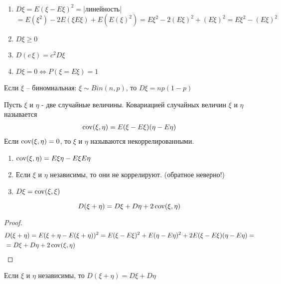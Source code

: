 \begin{lemma}~
	\begin{enumerate}
		\item $D\xi = E(\xi - E\xi)^2 = $|линейность|$ = E(\xi^2) - 2E(\xi E\xi) + E(E(\xi)^2) = E\xi^2 - 2(E\xi)^2 + (E\xi)^2  =E\xi^2 - (E\xi)^2$
		\item $D\xi \geq 0$
		\item $D(c\, \xi) = c^2 D\xi$
		\item $D\xi = 0 \Leftrightarrow P(\xi = E\xi) = 1$
	\end{enumerate}
\end{lemma}

\begin{statement}
	Если $\xi$ -- биномиальная: $\xi \sim Bin(n, p)$, то $D\xi = np (1 - p)$
\end{statement}

\begin{definition}
	Пусть $\xi$ и $\eta$ - две случайные величины. Ковариацией случайных величин $\xi$ и $\eta$ называется
	\begin{align*}
		\operatorname{cov}(\xi, \eta) = E(\xi - E\xi) (\eta - E\eta)
	\end{align*}
	Если $\operatorname{cov}(\xi, \eta) = 0$, то $\xi$ и $\eta$ называются некоррелированными.
\end{definition}

\begin{enumerate}
	\item $\operatorname{cov}(\xi, \eta) = E \xi \eta - E \xi E \eta$

	\item Если $\xi$ и $\eta$ независимы, то они не коррелируют. (обратное неверно!)

	\item $D\xi = \operatorname{cov}(\xi, \xi)$
\end{enumerate}

\begin{statement}
	\begin{equation*}
		D(\xi + \eta) = D\xi + D\eta + 2 \operatorname{cov}(\xi, \eta)
	\end{equation*}
\end{statement}

\begin{proof}
	\begin{align*}
		&D(\xi + \eta) = E(\xi + \eta - E(\xi + \eta))^2 = E(\xi - E\xi)^2 + E(\eta - E\eta)^2
		+ 2 E(\xi - E\xi)(\eta - E\eta) = \\ 
		&= D\xi + D\eta + 2 \operatorname{cov}(\xi, \eta)
	\end{align*}
\end{proof}

\begin{corollary}
	Если $\xi$ и $\eta$ независимы, то $D(\xi + \eta) = D\xi + D\eta$
\end{corollary}

